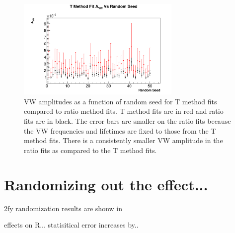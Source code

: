 \documentclass[12pt,letterpaper]{article}
\begin{document}
\begin{figure}[]
    \centering
    \includegraphics[width=0.7\textwidth]{vw-fixed-w-tau-9d-randseeds}
    \caption[]{VW amplitudes as a function of random seed for T method fits compared to ratio method fits. T method fits are in red and ratio fits are in black. The error bars are smaller on the ratio fits because the VW frequencies and lifetimes are fixed to those from the T method fits. There is a consistently smaller VW amplitude in the ratio fits as compared to the T method fits.}
    \label{fig:vw-fixed-w-tau-9d-randseeds}
\end{figure}





\section{Randomizing out the effect...}

2fy randomization results are shonw in \cite{wa_presentation}


effects on R...
statisitical error increases by.. 
\end{document}
